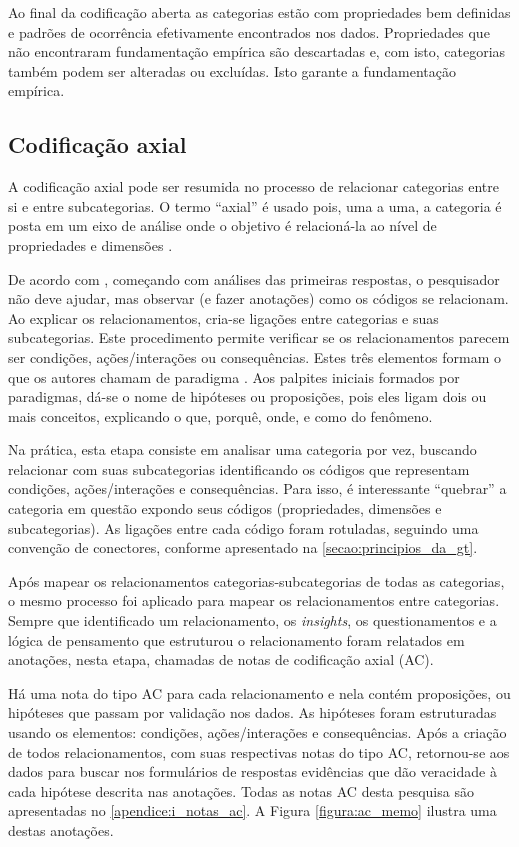 Ao final da codificação aberta as categorias estão com propriedades bem definidas e padrões de ocorrência efetivamente encontrados nos dados. Propriedades que não encontraram fundamentação empírica são descartadas e, com isto, categorias também podem ser alteradas ou excluídas. Isto garante a fundamentação empírica.

	\subsection{Codificação axial}
A codificação axial pode ser resumida no processo de relacionar categorias entre si e entre subcategorias. O termo “axial” é usado pois, uma a uma, a categoria é posta em um eixo de análise onde o objetivo é relacioná-la ao nível de propriedades e dimensões \cite{corbin:98}.

De acordo com , começando com análises das primeiras respostas, o pesquisador não deve ajudar, mas observar (e fazer anotações) como os códigos se relacionam. Ao explicar os relacionamentos, cria-se ligações entre categorias e suas subcategorias. Este procedimento permite verificar se os relacionamentos parecem ser condições, ações/interações ou consequências. Estes três elementos formam o que os autores chamam de paradigma \cite{conte:09}. Aos palpites iniciais formados por paradigmas, dá-se o nome de hipóteses ou proposições, pois eles ligam dois ou mais conceitos, explicando o que, porquê, onde, e como do fenômeno.

Na prática, esta etapa consiste em analisar uma categoria por vez, buscando relacionar com suas subcategorias identificando os códigos que representam condições, ações/interações e consequências. Para isso, é interessante ``quebrar'' a categoria em questão expondo seus códigos (propriedades, dimensões e subcategorias). As ligações entre cada código foram rotuladas, seguindo uma convenção de conectores, conforme apresentado na \autoref{secao:principios_da_gt}.

Após mapear os relacionamentos categorias-subcategorias de todas as categorias, o mesmo processo foi aplicado para mapear os relacionamentos entre categorias. Sempre que identificado um relacionamento, os \textit{insights}, os questionamentos e a lógica de pensamento que estruturou o relacionamento foram relatados em anotações, nesta etapa, chamadas de notas de codificação axial (AC). 

Há uma nota do tipo AC para cada relacionamento e nela contém proposições, ou hipóteses que passam por validação nos dados. As hipóteses foram estruturadas usando os elementos: condições, ações/interações e consequências. Após a criação de todos relacionamentos, com suas respectivas notas do tipo AC, retornou-se aos dados para buscar nos formulários de respostas evidências que dão veracidade à cada hipótese descrita nas anotações. Todas as notas AC desta pesquisa são apresentadas no \autoref{apendice:i_notas_ac}. A Figura \ref{figura:ac_memo} ilustra uma destas anotações.

